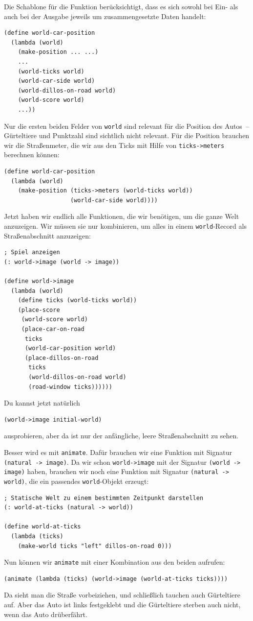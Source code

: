 %
Die Schablone für die Funktion berücksichtigt, dass es sich sowohl bei
Ein- als auch bei der Ausgabe jeweils um zusammengesetzte Daten handelt:
%
\begin{lstlisting}
(define world-car-position
  (lambda (world)
    (make-position ... ...)
    ...
    (world-ticks world)
    (world-car-side world)
    (world-dillos-on-road world)
    (world-score world)
    ...))
\end{lstlisting}
%
Nur die ersten beiden Felder von \lstinline{world} sind relevant für
die Position des Autos~-- Gürteltiere und Punktzahl sind sichtlich
nicht relevant.  Für die Position brauchen wir die Straßenmeter, die
wir aus den Ticks mit Hilfe von \lstinline{ticks->meters} berechnen
können:
%
\begin{lstlisting}
(define world-car-position
  (lambda (world)
    (make-position (ticks->meters (world-ticks world))
                   (world-car-side world))))
\end{lstlisting}
%
Jetzt haben wir endlich alle Funktionen, die wir benötigen, um die
ganze Welt anzuzeigen.  Wir müssen sie nur kombinieren, um alles in
einem \lstinline{world}-Record als Straßenabschnitt anzuzeigen:
%
\begin{lstlisting}
; Spiel anzeigen
(: world->image (world -> image))

(define world->image
  (lambda (world)
    (define ticks (world-ticks world))
    (place-score
     (world-score world)
     (place-car-on-road
      ticks
      (world-car-position world)
      (place-dillos-on-road
       ticks
       (world-dillos-on-road world)
       (road-window ticks))))))
\end{lstlisting}
%
Du kannst jetzt natürlich
%
\begin{lstlisting}
(world->image initial-world)
\end{lstlisting}
%
ausprobieren, aber da ist nur der anfängliche, leere Straßenabschnitt
zu sehen.

Besser wird es mit \lstinline{animate}.  Dafür brauchen wir eine
Funktion mit Signatur \lstinline{(natural -> image)}.  Da wir schon
\lstinline{world->image} mit der Signatur \lstinline{(world -> image)}
haben, brauchen wir noch eine Funktion mit Signatur
\lstinline{(natural -> world)}, die ein passendes
\lstinline{world}-Objekt erzeugt:
%
\begin{lstlisting}
; Statische Welt zu einem bestimmten Zeitpunkt darstellen
(: world-at-ticks (natural -> world))

(define world-at-ticks
  (lambda (ticks)
    (make-world ticks "left" dillos-on-road 0)))
\end{lstlisting}
%
Nun können wir \lstinline{animate} mit einer Kombination aus den
beiden aufrufen:
%
\begin{lstlisting}
(animate (lambda (ticks) (world->image (world-at-ticks ticks))))
\end{lstlisting}
%
Da sieht man die Straße vorbeiziehen, und schließlich tauchen auch
Gürteltiere auf.  Aber das Auto ist links festgeklebt und die
Gürteltiere sterben auch nicht, wenn das Auto drüberfährt.

